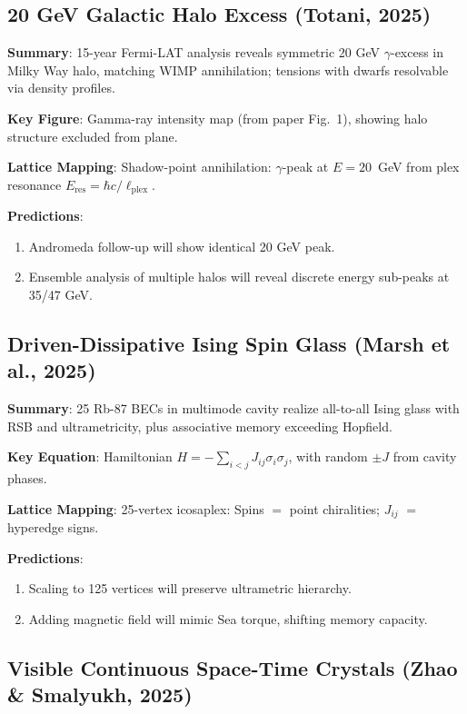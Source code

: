 \documentclass[11pt,a4paper]{article}
\begin{document}
\subsection{20 GeV Galactic Halo Excess (Totani, 2025)}

\textbf{Summary}: 15-year Fermi-LAT analysis reveals symmetric 20 GeV $\gamma$-excess in Milky Way halo, matching WIMP annihilation; tensions with dwarfs resolvable via density profiles.

\textbf{Key Figure}: Gamma-ray intensity map (from paper Fig.\ 1), showing halo structure excluded from plane.

\textbf{Lattice Mapping}: Shadow-point annihilation: $\gamma$-peak at $E = 20$~GeV from plex resonance $E_{\mathrm{res}} = \hbar c / \ell_{\mathrm{plex}}$.

\textbf{Predictions}:
\begin{enumerate}
\item Andromeda follow-up will show identical 20 GeV peak.
\item Ensemble analysis of multiple halos will reveal discrete energy sub-peaks at 35/47 GeV.
\end{enumerate}

\subsection{Driven-Dissipative Ising Spin Glass (Marsh et al., 2025)}

\textbf{Summary}: 25 Rb-87 BECs in multimode cavity realize all-to-all Ising glass with RSB and ultrametricity, plus associative memory exceeding Hopfield.

\textbf{Key Equation}: Hamiltonian $H = -\sum_{i<j} J_{ij} \sigma_i \sigma_j$, with random $\pm J$ from cavity phases.

\textbf{Lattice Mapping}: 25-vertex icosaplex: Spins $=$ point chiralities; $J_{ij}$ $=$ hyperedge signs.

\textbf{Predictions}:
\begin{enumerate}
\item Scaling to 125 vertices will preserve ultrametric hierarchy.
\item Adding magnetic field will mimic Sea torque, shifting memory capacity.
\end{enumerate}

\subsection{Visible Continuous Space-Time Crystals (Zhao \& Smalyukh, 2025)}
\end{document}

